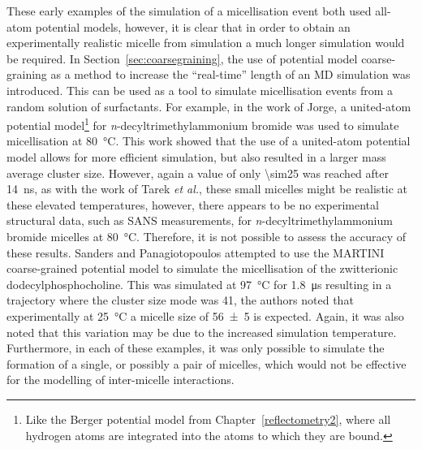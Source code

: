These early examples of the simulation of a micellisation event both used all-atom potential models, however, it is clear that in order to obtain an experimentally realistic micelle from simulation a much longer simulation would be required.
In Section~\ref{sec:coarsegraining}, the use of potential model coarse-graining as a method to increase the ``real-time'' length of an MD simulation was introduced.
This can be used as a tool to simulate micellisation events from a random solution of surfactants.
For example, in the work of Jorge, a united-atom potential model\footnote{Like the Berger potential model from Chapter~\ref{reflectometry2}, where all hydrogen atoms are integrated into the atoms to which they are bound.} for \emph{n}-decyltrimethylammonium bromide was used to simulate micellisation at \SI{80}{\celsius}.
This work showed that the use of a united-atom potential model allows for more efficient simulation, but also resulted in a larger mass average cluster size.
However, again a value of only \num{\sim25} was reached after \SI{14}{\nano\second}, as with the work of Tarek \emph{et al.}, these small micelles might be realistic at these elevated temperatures, however, there appears to be no experimental structural data, such as SANS measurements, for \emph{n}-decyltrimethylammonium bromide micelles at \SI{80}{\celsius}.
Therefore, it is not possible to assess the accuracy of these results.
Sanders and Panagiotopoulos attempted to use the MARTINI coarse-grained potential model to simulate the micellisation of the zwitterionic dodecylphosphocholine.
This was simulated at \SI{97}{\celsius} for \SI{1.8}{\micro\second} resulting in a trajectory where the cluster size mode was 41, the authors noted that experimentally at \SI{25}{\celsius} a micelle size of \num{56\pm5} is expected.
Again, it was also noted that this variation may be due to the increased simulation temperature.
Furthermore, in each of these examples, it was only possible to simulate the formation of a single, or possibly a pair of micelles, which would not be effective for the modelling of inter-micelle interactions.


